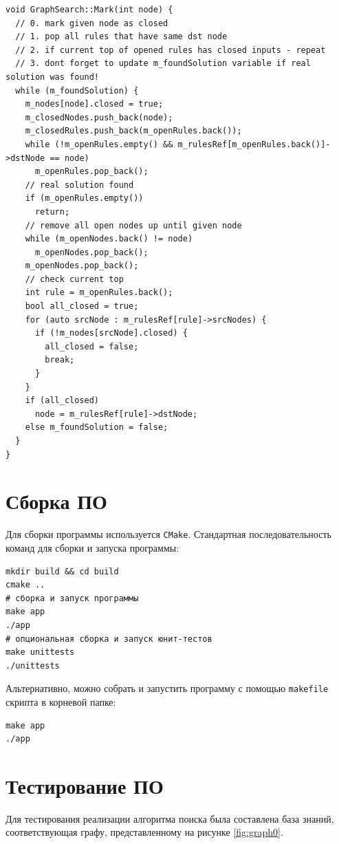 \begin{lstlisting}
void GraphSearch::Mark(int node) {
  // 0. mark given node as closed
  // 1. pop all rules that have same dst node
  // 2. if current top of opened rules has closed inputs - repeat
  // 3. dont forget to update m_foundSolution variable if real solution was found!
  while (m_foundSolution) {
    m_nodes[node].closed = true;
    m_closedNodes.push_back(node);
    m_closedRules.push_back(m_openRules.back());
    while (!m_openRules.empty() && m_rulesRef[m_openRules.back()]->dstNode == node)
      m_openRules.pop_back();
    // real solution found
    if (m_openRules.empty())
      return;
    // remove all open nodes up until given node
    while (m_openNodes.back() != node)
      m_openNodes.pop_back();
    m_openNodes.pop_back();
    // check current top
    int rule = m_openRules.back();
    bool all_closed = true;
    for (auto srcNode : m_rulesRef[rule]->srcNodes) {
      if (!m_nodes[srcNode].closed) {
        all_closed = false;
        break;
      }
    }
    if (all_closed)
      node = m_rulesRef[rule]->dstNode;
    else m_foundSolution = false;
  }
}
\end{lstlisting}

\section{Сборка ПО}

Для сборки программы используется \texttt{CMake}. Стандартная последовательность команд для сборки и запуска программы:

\begin{verbatim}
mkdir build && cd build
cmake ..
# сборка и запуск программы
make app
./app
# опциональная сборка и запуск юнит-тестов
make unittests
./unittests
\end{verbatim}

Альтернативно, можно собрать и запустить программу с помощью \texttt{makefile} скрипта в корневой папке:

\begin{verbatim}
make app
./app
\end{verbatim}

\clearpage

\section{Тестирование ПО}

Для тестирования реализации алгоритма поиска была составлена база знаний, соответствующая графу, представленному на рисунке \ref{fig:graph0}.

